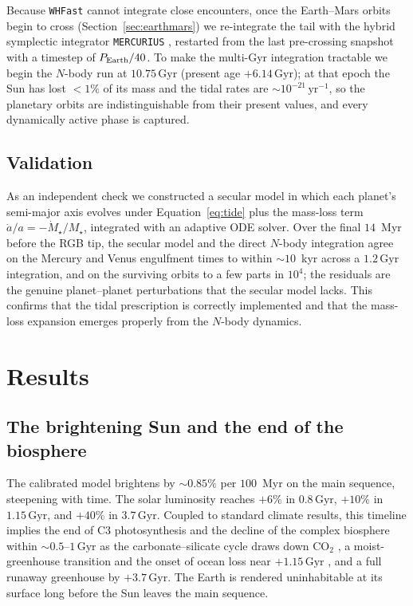 \documentclass[twocolumn]{aastex631}
\newcommand{\gyr}{\,\mathrm{Gyr}}
\newcommand{\code}[1]{\texttt{#1}}
\begin{document}
Because \code{WHFast} cannot integrate close encounters, once the Earth--Mars orbits
begin to cross (Section~\ref{sec:earthmars}) we re-integrate the tail with the
hybrid symplectic integrator \code{MERCURIUS} \citep{ReinMercurius2019}, restarted
from the last pre-crossing snapshot with a timestep of $P_{\rm Earth}/40$. To make
the multi-Gyr integration tractable we begin the $N$-body run at $10.75\gyr$
(present age $+6.14\gyr$); at that epoch the Sun has lost $<1\%$ of its mass and the
tidal rates are $\sim10^{-21}\,\mathrm{yr}^{-1}$, so the planetary orbits are
indistinguishable from their present values, and every dynamically active phase is
captured.

\subsection{Validation}
\label{sec:validation}

As an independent check we constructed a secular model in which each planet's
semi-major axis evolves under Equation~\eqref{eq:tide} plus the mass-loss term
$\dot a/a=-\dot M_\star/M_\star$, integrated with an adaptive ODE solver. Over the
final $14$~Myr before the RGB tip, the secular model and the direct $N$-body
integration agree on the Mercury and Venus engulfment times to within $\sim10$~kyr
across a $1.2\gyr$ integration, and on the surviving orbits to a few parts in
$10^4$; the residuals are the genuine planet--planet perturbations that the secular
model lacks. This confirms that the tidal prescription is correctly implemented and
that the mass-loss expansion emerges properly from the $N$-body dynamics.

\section{Results}
\label{sec:results}

\subsection{The brightening Sun and the end of the biosphere}

The calibrated model brightens by $\sim0.85\%$ per $100$~Myr on the main sequence,
steepening with time. The solar luminosity reaches $+6\%$ in $0.8\gyr$, $+10\%$ in
$1.15\gyr$, and $+40\%$ in $3.7\gyr$. Coupled to standard climate results, this
timeline implies the end of C3 photosynthesis and the decline of the complex
biosphere within $\sim0.5$--$1\gyr$ as the carbonate--silicate cycle draws down
CO$_2$ \citep{Caldeira1992,OMalleyJames2013}, a moist-greenhouse transition and the
onset of ocean loss near $+1.15\gyr$ \citep{Wolf2015}, and a full runaway greenhouse
by $+3.7\gyr$. The Earth is rendered uninhabitable at its surface long before the
Sun leaves the main sequence.
\end{document}
